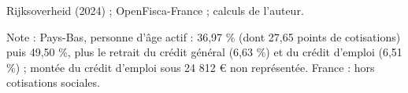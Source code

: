 Rijksoverheid (2024) ; OpenFisca-France ; calculs de l'auteur.\par Note : Pays-Bas, personne d'âge actif : 36,97 \% (dont 27,65 points de cotisations) puis 49,50 \%, plus le retrait du crédit général (6,63 \%) et du crédit d'emploi (6,51 \%) ; montée du crédit d'emploi sous 24 812 \euro{} non représentée. France : hors cotisations sociales.
